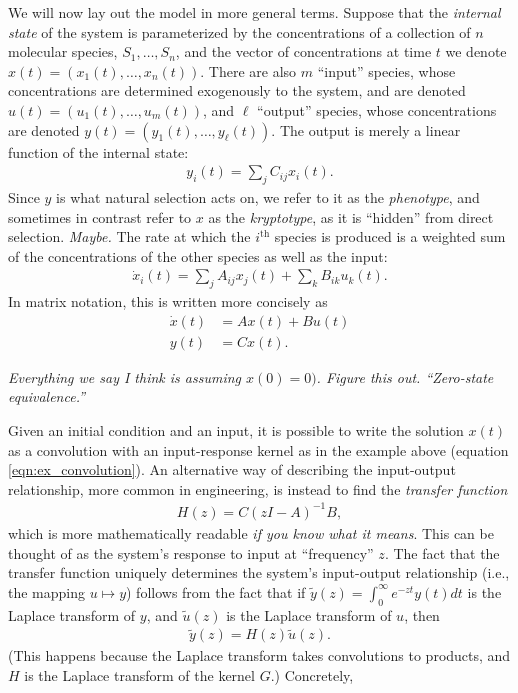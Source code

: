 \documentclass[11 pt]{article}
\newcommand{\plr}[1]{{\color{blue}\it #1}}
\newcommand{\ddt}{\dot}
\begin{document}
We will now lay out the model in more general terms.
Suppose that the \emph{internal state} of the system
is parameterized by the concentrations of a collection of $n$ molecular species,
$S_1, \ldots, S_n$,
and the vector of concentrations at time $t$ we denote $x(t)=(x_1(t),\ldots,x_n(t))$.
There are also $m$ ``input'' species, whose concentrations are determined
exogenously to the system,
and are denoted $u(t) = (u_1(t),\ldots,u_m(t))$,
and $\ell$ ``output'' species, whose concentrations are denoted
$y(t) = (y_1(t),\ldots,y_\ell(t))$.
The output is merely a linear function of the internal state:
\begin{align*}
    y_i(t) = \sum_j C_{ij} x_i(t).
\end{align*}
Since $y$ is what natural selection acts on, we refer to it as the \emph{phenotype},
and sometimes in contrast refer to $x$ as the \emph{kryptotype},
as it is ``hidden'' from direct selection.
\plr{Maybe.}
The rate at which the $i^\text{th}$ species is produced
is a weighted sum of the concentrations of the other species
as well as the input:
\begin{align*}
    \ddt x_i(t) = \sum_j A_{ij} x_j(t) + \sum_k B_{ik} u_k(t) .
\end{align*}
In matrix notation, this is written more concisely as
\begin{align} \label{eqn:lti_system}
    \ddt x(t) &= A x(t) + B u(t) \\
    y(t) &= C x(t) .
\end{align}

\plr{Everything we say I think is assuming $x(0)=0)$.  
Figure this out. ``Zero-state equivalence.''}

Given an initial condition and an input, 
it is possible to write the solution $x(t)$
as a convolution with an input-response kernel as in the example above
(equation \eqref{eqn:ex_convolution}).
An alternative way of describing the input-output relationship,
more common in engineering,
is instead to find the \emph{transfer function}
\begin{align} \label{eqn:transfer_fn}
    H(z) = C(z I - A)^{-1} B,
\end{align}
which is more mathematically readable \plr{if you know what it means}.
This can be thought of as the system's response to input at ``frequency'' $z$.
The fact that the transfer function uniquely determines the system's
input-output relationship (i.e., the mapping $u \mapsto y$)
follows from the fact that if $\tilde y(z) = \int_0^\infty e^{-zt} y(t) dt$
is the Laplace transform of $y$,
and $\tilde u(z)$ is the Laplace transform of $u$,
then
\begin{align*}
    \tilde y(z) = H(z) \tilde u(z) .
\end{align*}
(This happens because the Laplace transform takes convolutions to products,
and $H$ is the Laplace transform of the kernel $G$.)
Concretely,
\end{document}
